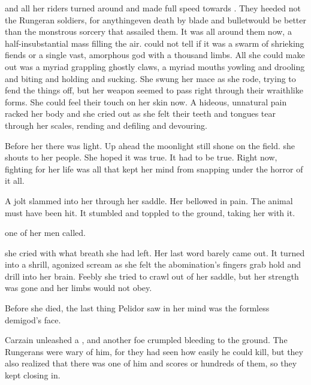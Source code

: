 \begin{comment}
  \subsection{\Dornaer dies}
\end{comment}
\Dornaer and all her riders turned around and made full speed towards \Forclin. 
They heeded not the Rungeran soldiers, for anything\dash even death by blade and bullet\dash would be better than the monstrous sorcery that assailed them. 
It was all around them now, a half-insubstantial mass filling the air. 
\Dornaer could not tell if it was a swarm of shrieking fiends or a single vast, amorphous god with a thousand limbs. 
All she could make out was a myriad grappling ghostly claws, a myriad mouths yowling and drooling and biting and holding and sucking. 
She swung her mace as she rode, trying to fend the things off, but her weapon seemed to pass right through their wraithlike forms. 
She could feel their touch on her skin now.
A hideous, unnatural pain racked her body and she cried out as she felt their teeth and tongues tear through her scales, rending and defiling and devouring. 

Before her there was light. 
Up ahead the moonlight still shone on the field. 
 she shouts to her people. 
She hoped it was true. 
It had to be true. 
Right now, fighting for her life was all that kept her mind from snapping under the horror of it all. 

A jolt slammed into her through her saddle. 
Her \relc bellowed in pain.
The animal must have been hit. 
It stumbled and toppled to the ground, taking her with it. 

\ta{\Rah[\Dornaer]!} one of her men called.

 she cried with what breath she had left.
Her last word barely came out.
It turned into a shrill, agonized scream as she felt the abomination's fingers grab hold and drill into her brain. 
Feebly she tried to crawl out of her saddle, but her strength was gone and her limbs would not obey. 

Before she died, the last thing \rah[\Dornaer] Pelidor saw in her mind was the formless demigod's face. 





\begin{comment}
  \subsection{Carzain fights for his life}
\end{comment}
Carzain unleashed a \qliphah, and another foe crumpled bleeding to the ground. 
The Rungerans were wary of him, for they had seen how easily he could kill, but they also realized that there was one of him and scores or hundreds of them, so they kept closing in. 

